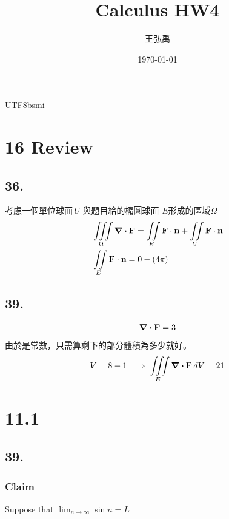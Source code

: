 \documentclass[12pt, a4paper]{article}
\title{\textbf{Calculus HW4}}
\author{王弘禹}
\date\today
\begin{document}
\begin{CJK*}{UTF8}{bsmi}
\linespread{1.5}
\maketitle
\newcommand{\st}[1]{\section*{#1}}
\newcommand{\sst}[1]{\subsection*{#1}}
\newcommand{\ssst}[1]{\subsubsection*{#1}}
\newcommand{\dsp}{\displaystyle}
\newcommand{\dx}{\,dx}
\newcommand{\dphi}{\,d\phi}
\newcommand{\dtheta}{\,d\theta}
\newcommand{\dy}{\,dy}
\newcommand{\dz}{\,dz}
\newcommand{\dr}{\,dr}
\newcommand{\drho}{\,d\rho}
\newcommand{\tb}{\textbf}
\st{16 Review}
\sst{36.}
考慮一個單位球面$\,U$ 與題目給的橢圓球面 $E$形成的區域$\Omega$
\begin{align}
    &\iiint\limits_\Omega \div{\tb F} = \iint\limits_E \tb F\cdot \tb n +\iint\limits_U \tb F\cdot\tb n \\
    &\iint\limits_E \tb F\cdot \tb n = 0-(4\pi)
\end{align}

\sst{39.}
\begin{align}
    \div{\tb F} = 3
\end{align}
由於是常數，只需算剩下的部分體積為多少就好。
\begin{align}
    V = 8-1 \implies \iiint\limits_E \div{\tb F}\,dV = 21
\end{align}
\st{11.1}
\sst{39.}
\ssst{Claim}
Suppose that $\dsp\lim_{n\to \infty}\sin n =L$
\end{CJK*}
\end{document}

